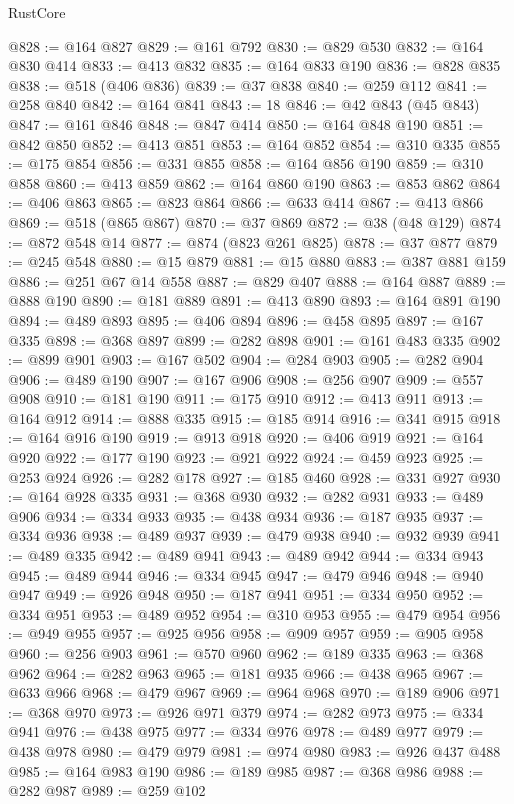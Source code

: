 \begin{lexlean}{RustCore}
\begin{coremodule}
@828 := @164 @827
@829 := @161 @792
@830 := @829 @530
@832 := @164 @830 @414
@833 := @413 @832
@835 := @164 @833 @190
@836 := @828 @835
@838 := @518 (@406 @836)
@839 := @37 @838
@840 := @259 @112
@841 := @258 @840
@842 := @164 @841
@843 := 18
@846 := @42 @843 (@45 @843)
@847 := @161 @846
@848 := @847 @414
@850 := @164 @848 @190
@851 := @842 @850
@852 := @413 @851
@853 := @164 @852
@854 := @310 @335
@855 := @175 @854
@856 := @331 @855
@858 := @164 @856 @190
@859 := @310 @858
@860 := @413 @859
@862 := @164 @860 @190
@863 := @853 @862
@864 := @406 @863
@865 := @823 @864
@866 := @633 @414
@867 := @413 @866
@869 := @518 (@865 @867)
@870 := @37 @869
@872 := @38 (@48 @129)
@874 := @872 @548 @14
@877 := @874 (@823 @261 @825)
@878 := @37 @877
@879 := @245 @548
@880 := @15 @879
@881 := @15 @880
@883 := @387 @881 @159
@886 := @251 @67 @14 @558
@887 := @829 @407
@888 := @164 @887
@889 := @888 @190
@890 := @181 @889
@891 := @413 @890
@893 := @164 @891 @190
@894 := @489 @893
@895 := @406 @894
@896 := @458 @895
@897 := @167 @335
@898 := @368 @897
@899 := @282 @898
@901 := @161 @483 @335
@902 := @899 @901
@903 := @167 @502
@904 := @284 @903
@905 := @282 @904
@906 := @489 @190
@907 := @167 @906
@908 := @256 @907
@909 := @557 @908
@910 := @181 @190
@911 := @175 @910
@912 := @413 @911
@913 := @164 @912
@914 := @888 @335
@915 := @185 @914
@916 := @341 @915
@918 := @164 @916 @190
@919 := @913 @918
@920 := @406 @919
@921 := @164 @920
@922 := @177 @190
@923 := @921 @922
@924 := @459 @923
@925 := @253 @924
@926 := @282 @178
@927 := @185 @460
@928 := @331 @927
@930 := @164 @928 @335
@931 := @368 @930
@932 := @282 @931
@933 := @489 @906
@934 := @334 @933
@935 := @438 @934
@936 := @187 @935
@937 := @334 @936
@938 := @489 @937
@939 := @479 @938
@940 := @932 @939
@941 := @489 @335
@942 := @489 @941
@943 := @489 @942
@944 := @334 @943
@945 := @489 @944
@946 := @334 @945
@947 := @479 @946
@948 := @940 @947
@949 := @926 @948
@950 := @187 @941
@951 := @334 @950
@952 := @334 @951
@953 := @489 @952
@954 := @310 @953
@955 := @479 @954
@956 := @949 @955
@957 := @925 @956
@958 := @909 @957
@959 := @905 @958
@960 := @256 @903
@961 := @570 @960
@962 := @189 @335
@963 := @368 @962
@964 := @282 @963
@965 := @181 @935
@966 := @438 @965
@967 := @633 @966
@968 := @479 @967
@969 := @964 @968
@970 := @189 @906
@971 := @368 @970
@973 := @926 @971 @379
@974 := @282 @973
@975 := @334 @941
@976 := @438 @975
@977 := @334 @976
@978 := @489 @977
@979 := @438 @978
@980 := @479 @979
@981 := @974 @980
@983 := @926 @437 @488
@985 := @164 @983 @190
@986 := @189 @985
@987 := @368 @986
@988 := @282 @987
@989 := @259 @102

\end{coremodule}
\end{lexlean}
